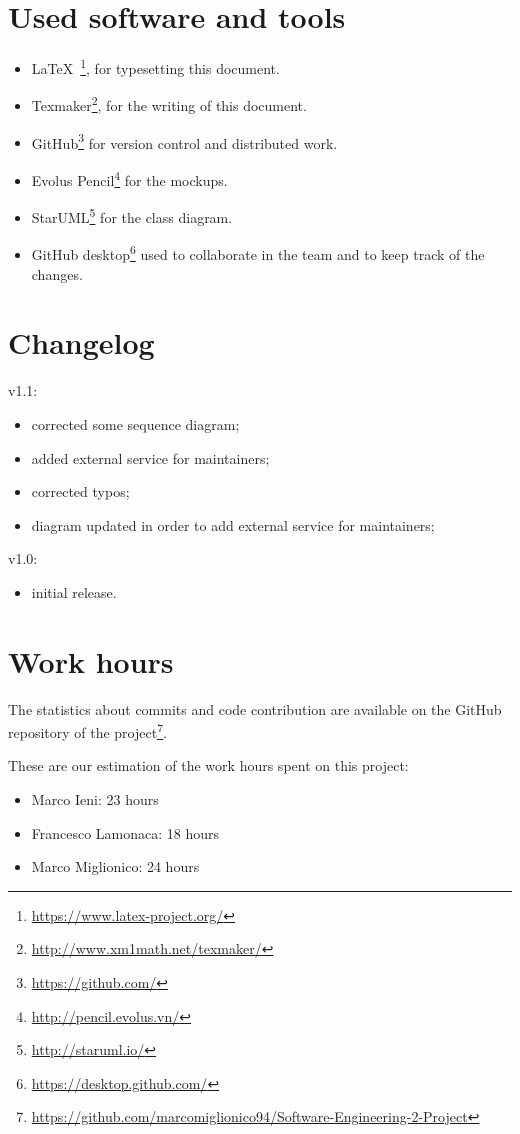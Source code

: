 \section{Used software and tools}
\begin{itemize}
    \item \LaTeX\ \footnote{\url{https://www.latex-project.org/}}, for typesetting this document.
    \item Texmaker\footnote{\url{http://www.xm1math.net/texmaker/}}, for the writing of this document.
    \item GitHub\footnote{\url{https://github.com/}} for version control and distributed work.
    \item Evolus Pencil\footnote{\url{http://pencil.evolus.vn/}} for the mockups.
    \item StarUML\footnote{\url{http://staruml.io/}} for the class diagram.
    \item GitHub desktop\footnote{\url{https://desktop.github.com/}} used to collaborate in the team and to keep track of the changes. 
\end{itemize}

\section{Changelog}

v1.1:
\begin{itemize}
\item corrected some sequence diagram;
\item added external service for maintainers;
\item corrected typos;
\item diagram updated in order to add external service for maintainers;
\end{itemize}

v1.0:
\begin{itemize}
\item initial release.
\end{itemize}


\section{Work hours}
The statistics about commits and code contribution are available on the GitHub repository of the project\footnote{\url{https://github.com/marcomiglionico94/Software-Engineering-2-Project}}.

These are our estimation of the work hours spent on this project:
\begin{itemize}
    \item Marco Ieni: 23 hours
    \item Francesco Lamonaca: 18 hours
    \item Marco Miglionico: 24 hours
\end{itemize}
